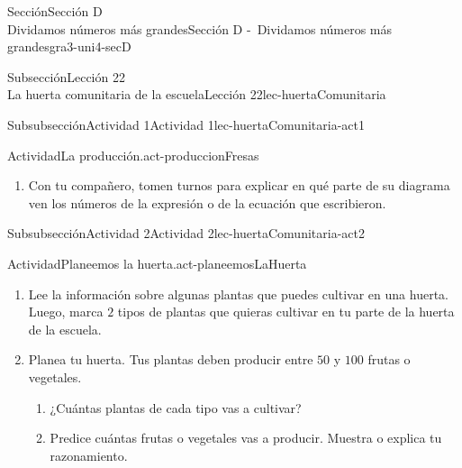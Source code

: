 \begin{sectionptx}{Sección}{{\Large Sección D\\}Dividamos números más grandes}{}{Sección D -~Dividamos números más grandes}{}{}{gra3-uni4-secD}
\begin{subsectionptx}{Subsección}{{\normalsize Lección 22\\[-0.05cm]}La huerta comunitaria de la escuela}{}{Lección 22}{}{}{lec-huertaComunitaria}
\begin{subsubsectionptx}{Subsubsección}{Actividad 1}{}{Actividad 1}{}{}{lec-huertaComunitaria-act1}
\begin{activity}{Actividad}{La producción.}{act-produccionFresas}
\begin{enumerate}
\begin{enumerate}
\item{}Para cultivar fresas de la mejor manera, las filas deben estar separadas por \(4\) pies. En cada fila, debe haber \(2\) pies de distancia entre planta y planta. ¿Qué tan larga y qué tan ancha es la parcela de fresas?%
\item{}Se pueden cosechar \(12\) fresas de cada planta. ¿Cuántas fresas van a crecer en cada fila?%
\end{enumerate}
\item{}Con tu compañero, tomen turnos para explicar en qué parte de su diagrama ven los números de la expresión o de la ecuación que escribieron.%
\end{enumerate}
\end{activity}%
\end{subsubsectionptx}
%
%
\typeout{************************************************}
\typeout{************************************************}
%
\clearpage
\begin{subsubsectionptx}{Subsubsección}{Actividad 2}{}{Actividad 2}{}{}{lec-huertaComunitaria-act2}
\begin{activity}{Actividad}{Planeemos la huerta.}{act-planeemosLaHuerta}%
%
\begin{enumerate}
\item{}Lee la información sobre algunas plantas que puedes cultivar en una huerta. Luego, marca \(2\) tipos de plantas que quieras cultivar en tu parte de la huerta de la escuela.%
%
\begin{enumerate}
\end{enumerate}
\item{}Planea tu huerta. Tus plantas deben producir entre \(50\) y \(100\) frutas o vegetales.%
%
\begin{enumerate}
\item{}¿Cuántas plantas de cada tipo vas a cultivar?%
\item{}Predice cuántas frutas o vegetales vas a producir. Muestra o explica tu razonamiento.%

\end{enumerate}
\end{enumerate}
\end{activity}
\end{subsubsectionptx}
\end{subsectionptx}
\end{sectionptx}
